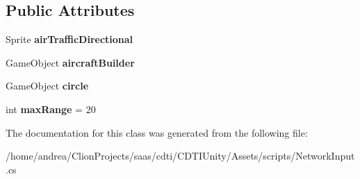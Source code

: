 \subsection*{Public Attributes}
\begin{DoxyCompactItemize}
\item 
Sprite {\bfseries air\+Traffic\+Directional}\hypertarget{class_network_input_a645c85b706841b9efd9be62cecff9e37}{}\label{class_network_input_a645c85b706841b9efd9be62cecff9e37}

\item 
Game\+Object {\bfseries aircraft\+Builder}\hypertarget{class_network_input_a4cbaddf7224566f6a01d23a1788b723d}{}\label{class_network_input_a4cbaddf7224566f6a01d23a1788b723d}

\item 
Game\+Object {\bfseries circle}\hypertarget{class_network_input_a8465b038857f973c9a8b7513ead2b563}{}\label{class_network_input_a8465b038857f973c9a8b7513ead2b563}

\item 
int {\bfseries max\+Range} = 20\hypertarget{class_network_input_a3b50fccf39e33592acc615ab7f70abe8}{}\label{class_network_input_a3b50fccf39e33592acc615ab7f70abe8}

\end{DoxyCompactItemize}


The documentation for this class was generated from the following file\+:\begin{DoxyCompactItemize}
\item 
/home/andrea/\+Clion\+Projects/saas/cdti/\+C\+D\+T\+I\+Unity/\+Assets/scripts/Network\+Input.\+cs\end{DoxyCompactItemize}
